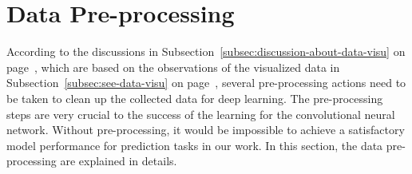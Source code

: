 \section{Data Pre-processing}\label{sec:data-preprocessing}
According to the discussions in 
Subsection~\ref{subsec:discussion-about-data-visu}
on page~\pageref{subsec:discussion-about-data-visu},
which are based on the observations
of the visualized data in
Subsection~\ref{subsec:see-data-visu}
on page~\pageref{subsec:see-data-visu},
several pre-processing actions need
to be taken to clean up the collected data for deep learning.
The pre-processing steps are very crucial to the success
of the learning for the convolutional neural network.
Without pre-processing, it would be impossible
to achieve a satisfactory model performance 
for prediction tasks in our work.
In this section, the data pre-processing
are explained in details.

